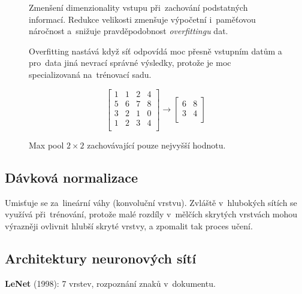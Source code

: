 \begin{figure}[ht]
\onehalfspacing
\begin{minipage}[c]{0.68\textwidth}
    Zmenšení dimenzionality vstupu při~zachování podstatných informací.
    Redukce velikosti zmenšuje výpočetní i~paměťovou náročnost a~snižuje pravděpodobnost \emph{overfittingu} dat.

    \vspace*{1em}
    Overfitting nastává když síť odpovídá moc přesně vstupním datům a pro~data jiná nevrací správné výsledky, protože je moc specializovaná na~trénovací sadu.
\end{minipage}
\begin{minipage}[c]{0.30\textwidth}
    $$
    \left[\begin{matrix}
    1 & 1 & 2 & 4 \\
    5 & 6 & 7 & 8 \\
    3 & 2 & 1 & 0 \\
    1 & 2 & 3 & 4 \\
    \end{matrix} \right] \rightarrow \left[\begin{matrix}
    6 & 8 \\
    3 & 4 \\
    \end{matrix} \right]
    $$
    \caption{Max pool $2 \times 2$ zachovávající pouze nejvyšší hodnotu.}
\end{minipage}
\end{figure}
\FloatBarrier

\subsection{Dávková normalizace}

Umisťuje se za~lineární váhy (konvoluční vrstvu).
Zvláště v~hlubokých sítích se využívá při~trénování, protože malé rozdíly v~mělčích skrytých vrstvách mohou výrazněji ovlivnit hlubší skryté vrstvy, a zpomalit tak proces učení.

\subsection{Architektury neuronových sítí}


\textbf{LeNet} (1998): 7 vrstev, rozpoznání znaků v~dokumentu.

